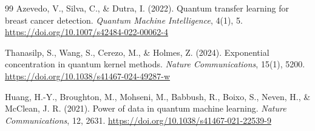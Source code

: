 \begin{thebibliography}{99}
    Azevedo, V., Silva, C., \& Dutra, I. (2022). Quantum transfer learning for breast
    cancer detection. \textit{Quantum Machine Intelligence}, 4(1), 5.
    \url{https://doi.org/10.1007/s42484-022-00062-4}


    Thanasilp, S., Wang, S., Cerezo, M., \& Holmes, Z. (2024).
    Exponential concentration in quantum kernel methods.
    \textit{Nature Communications}, 15(1), 5200.
    \url{https://doi.org/10.1038/s41467-024-49287-w}

    Huang, H.-Y., Broughton, M., Mohseni, M., Babbush, R., Boixo, S., Neven, H., \& McClean, J. R. (2021). Power of data in quantum machine learning.
    \textit{Nature Communications}, 12, 2631.
    \url{https://doi.org/10.1038/s41467-021-22539-9}

\end{thebibliography}
